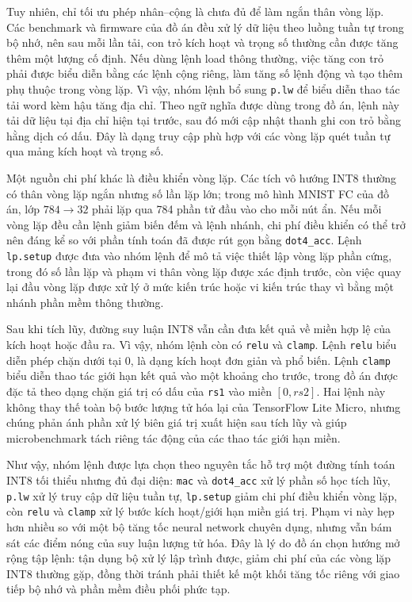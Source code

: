 \documentclass[../DoAn.tex]{subfiles}
\begin{document}
Tuy nhiên, chỉ tối ưu phép nhân--cộng là chưa đủ để làm ngắn thân vòng lặp. Các benchmark và firmware của đồ án đều xử lý dữ liệu theo luồng tuần tự trong bộ nhớ, nên sau mỗi lần tải, con trỏ kích hoạt và trọng số thường cần được tăng thêm một lượng cố định. Nếu dùng lệnh load thông thường, việc tăng con trỏ phải được biểu diễn bằng các lệnh cộng riêng, làm tăng số lệnh động và tạo thêm phụ thuộc trong vòng lặp. Vì vậy, nhóm lệnh bổ sung \texttt{p.lw} để biểu diễn thao tác tải word kèm hậu tăng địa chỉ. Theo ngữ nghĩa được dùng trong đồ án, lệnh này tải dữ liệu tại địa chỉ hiện tại trước, sau đó mới cập nhật thanh ghi con trỏ bằng hằng dịch có dấu. Đây là dạng truy cập phù hợp với các vòng lặp quét tuần tự qua mảng kích hoạt và trọng số.

Một nguồn chi phí khác là điều khiển vòng lặp. Các tích vô hướng INT8 thường có thân vòng lặp ngắn nhưng số lần lặp lớn; trong mô hình MNIST FC của đồ án, lớp \(784 \rightarrow 32\) phải lặp qua 784 phần tử đầu vào cho mỗi nút ẩn. Nếu mỗi vòng lặp đều cần lệnh giảm biến đếm và lệnh nhánh, chi phí điều khiển có thể trở nên đáng kể so với phần tính toán đã được rút gọn bằng \texttt{dot4\_acc}. Lệnh \texttt{lp.setup} được đưa vào nhóm lệnh để mô tả việc thiết lập vòng lặp phần cứng, trong đó số lần lặp và phạm vi thân vòng lặp được xác định trước, còn việc quay lại đầu vòng lặp được xử lý ở mức kiến trúc hoặc vi kiến trúc thay vì bằng một nhánh phần mềm thông thường.

Sau khi tích lũy, đường suy luận INT8 vẫn cần đưa kết quả về miền hợp lệ của kích hoạt hoặc đầu ra. Vì vậy, nhóm lệnh còn có \texttt{relu} và \texttt{clamp}. Lệnh \texttt{relu} biểu diễn phép chặn dưới tại 0, là dạng kích hoạt đơn giản và phổ biến. Lệnh \texttt{clamp} biểu diễn thao tác giới hạn kết quả vào một khoảng cho trước, trong đồ án được đặc tả theo dạng chặn giá trị có dấu của \texttt{rs1} vào miền \([0, rs2]\). Hai lệnh này không thay thế toàn bộ bước lượng tử hóa lại của TensorFlow Lite Micro, nhưng chúng phản ánh phần xử lý biên giá trị xuất hiện sau tích lũy và giúp microbenchmark tách riêng tác động của các thao tác giới hạn miền.

Như vậy, nhóm lệnh được lựa chọn theo nguyên tắc hỗ trợ một đường tính toán INT8 tối thiểu nhưng đủ đại diện: \texttt{mac} và \texttt{dot4\_acc} xử lý phần số học tích lũy, \texttt{p.lw} xử lý truy cập dữ liệu tuần tự, \texttt{lp.setup} giảm chi phí điều khiển vòng lặp, còn \texttt{relu} và \texttt{clamp} xử lý bước kích hoạt/giới hạn miền giá trị. Phạm vi này hẹp hơn nhiều so với một bộ tăng tốc neural network chuyên dụng, nhưng vẫn bám sát các điểm nóng của suy luận lượng tử hóa. Đây là lý do đồ án chọn hướng mở rộng tập lệnh: tận dụng bộ xử lý lập trình được, giảm chi phí của các vòng lặp INT8 thường gặp, đồng thời tránh phải thiết kế một khối tăng tốc riêng với giao tiếp bộ nhớ và phần mềm điều phối phức tạp.
\end{document}
